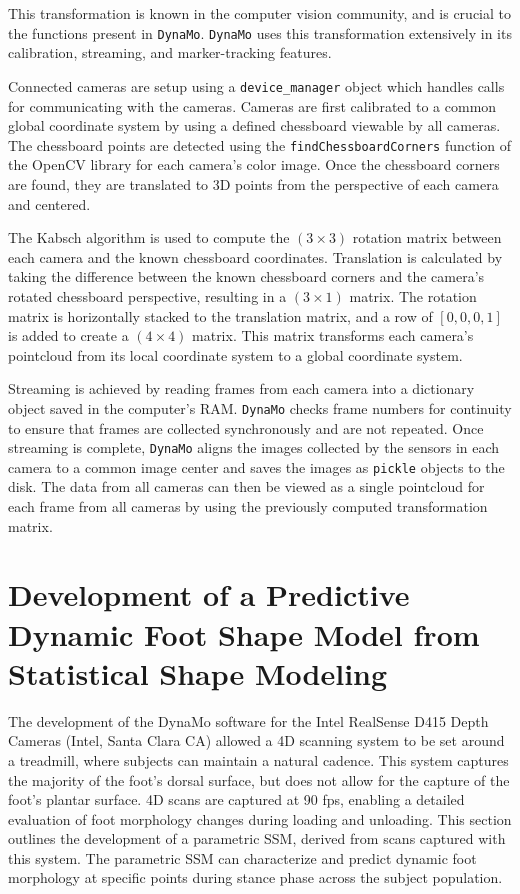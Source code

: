 \documentclass[defaultstyle,11pt]{comps}
\begin{document}
This transformation is known in the computer vision community, and is crucial to the functions present in \texttt{DynaMo}.
\texttt{DynaMo} uses this transformation extensively in its calibration, streaming, and marker-tracking features.

Connected cameras are setup using a \texttt{device\_manager} object which handles calls for communicating with the cameras.
Cameras are first calibrated to a common global coordinate system by using a defined chessboard viewable by all cameras.
The chessboard points are detected using the \texttt{findChessboardCorners} function of the OpenCV library \citep{opencv_library} for each camera's color image.
Once the chessboard corners are found, they are translated to 3D points from the perspective of each camera and centered.

The Kabsch algorithm \citep{Kabsch:1976} is used to compute the \((3\times3)\) rotation matrix between each camera and the known chessboard coordinates.
Translation is calculated by taking the difference between the known chessboard corners and the camera's rotated chessboard perspective, resulting in a \((3\times1)\) matrix.
The rotation matrix is horizontally stacked to the translation matrix, and a row of \([0,0,0,1]\) is added to create a \((4\times4)\) matrix.
This matrix transforms each camera's pointcloud from its local coordinate system to a global coordinate system.

Streaming is achieved by reading frames from each camera into a dictionary object saved in the computer's RAM.
\texttt{DynaMo} checks frame numbers for continuity to ensure that frames are collected synchronously and are not repeated.
Once streaming is complete, \texttt{DynaMo} aligns the images collected by the sensors in each camera to a common image center and saves the images as \texttt{pickle} objects to the disk.
The data from all cameras can then be viewed as a single pointcloud for each frame from all cameras by using the previously computed transformation matrix.

\hypertarget{development-of-a-predictive-dynamic-foot-shape-model-from-statistical-shape-modeling}{%
\section{Development of a Predictive Dynamic Foot Shape Model from Statistical Shape Modeling}\label{development-of-a-predictive-dynamic-foot-shape-model-from-statistical-shape-modeling}}

The development of the DynaMo software \citep{Boppana2019} for the Intel RealSense D415 Depth Cameras (Intel, Santa Clara CA) allowed a 4D scanning system to be set around a treadmill, where subjects can maintain a natural cadence.
This system captures the majority of the foot's dorsal surface, but does not allow for the capture of the foot's plantar surface.
4D scans are captured at 90 fps, enabling a detailed evaluation of foot morphology changes during loading and unloading.
This section outlines the development of a parametric SSM, derived from scans captured with this system.
The parametric SSM can characterize and predict dynamic foot morphology at specific points during stance phase across the subject population.
\end{document}
